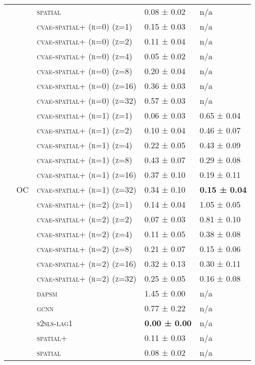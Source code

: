 \documentclass{article}
\begin{document}
\begin{table}[!tbp]
\begin{tabular}{lllll}
 &  & \textsc{spatial} & 0.08 ± { 0.02} & n/a \\
\cline{2-5}
 & \multirow[t]{23}{*}{OC} & \textsc{cvae-spatial+ (r=0) (z=1)} & 0.15 ± { 0.03} & n/a \\
 &  & \textsc{cvae-spatial+ (r=0) (z=2)} & 0.11 ± { 0.04} & n/a \\
 &  & \textsc{cvae-spatial+ (r=0) (z=4)} & 0.05 ± { 0.02} & n/a \\
 &  & \textsc{cvae-spatial+ (r=0) (z=8)} & 0.20 ± { 0.04} & n/a \\
 &  & \textsc{cvae-spatial+ (r=0) (z=16)} & 0.36 ± { 0.03} & n/a \\
 &  & \textsc{cvae-spatial+ (r=0) (z=32)} & 0.57 ± { 0.03} & n/a \\
 &  & \textsc{cvae-spatial+ (r=1) (z=1)} & 0.06 ± { 0.03} & 0.65 ± { 0.04} \\
 &  & \textsc{cvae-spatial+ (r=1) (z=2)} & 0.10 ± { 0.04} & 0.46 ± { 0.07} \\
 &  & \textsc{cvae-spatial+ (r=1) (z=4)} & 0.22 ± { 0.05} & 0.43 ± { 0.09} \\
 &  & \textsc{cvae-spatial+ (r=1) (z=8)} & 0.43 ± { 0.07} & 0.29 ± { 0.08} \\
 &  & \textsc{cvae-spatial+ (r=1) (z=16)} & 0.37 ± { 0.10} & 0.19 ± { 0.11} \\
 &  & \textsc{cvae-spatial+ (r=1) (z=32)} & 0.34 ± { 0.10} & \bf 0.15 ± { 0.04} \\
 &  & \textsc{cvae-spatial+ (r=2) (z=1)} & 0.14 ± { 0.04} & 1.05 ± { 0.05} \\
 &  & \textsc{cvae-spatial+ (r=2) (z=2)} & 0.07 ± { 0.03} & 0.81 ± { 0.10} \\
 &  & \textsc{cvae-spatial+ (r=2) (z=4)} & 0.11 ± { 0.05} & 0.38 ± { 0.08} \\
 &  & \textsc{cvae-spatial+ (r=2) (z=8)} & 0.21 ± { 0.07} & 0.15 ± { 0.06} \\
 &  & \textsc{cvae-spatial+ (r=2) (z=16)} & 0.32 ± { 0.13} & 0.30 ± { 0.11} \\
 &  & \textsc{cvae-spatial+ (r=2) (z=32)} & 0.25 ± { 0.05} & 0.16 ± { 0.08} \\
 &  & \textsc{dapsm} & 1.45 ± { 0.00} & n/a \\
 &  & \textsc{gcnn} & 0.77 ± { 0.22} & n/a \\
 &  & \textsc{s2sls-lag1} & \bf 0.00 ± { 0.00} & n/a \\
 &  & \textsc{spatial+} & 0.11 ± { 0.03} & n/a \\
 &  & \textsc{spatial} & 0.08 ± { 0.02} & n/a \\

\end{tabular}
\end{table}
\end{document}
